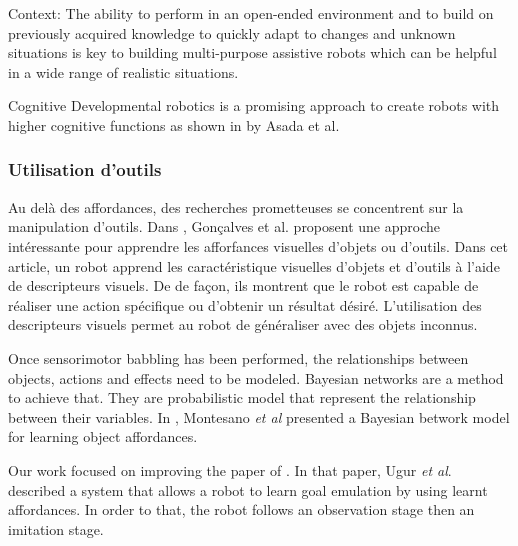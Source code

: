 \documentclass{llncs}
\begin{document}
Context: The ability to perform in an open-ended environment and to build on previously acquired knowledge to quickly adapt to changes and unknown situations is key to building
multi-purpose assistive robots which can be helpful in a wide range of realistic situations.

Cognitive Developmental robotics is a promising approach to create robots with higher cognitive functions as shown in \cite{Asada2009} by Asada et al.

\subsubsection{Utilisation d'outils}
Au delà des affordances, des recherches prometteuses se concentrent sur la manipulation d'outils. Dans \cite{Goncalves2014}, Gonçalves et al. proposent une approche intéressante pour apprendre les afforfances visuelles d'objets ou d'outils. Dans cet article, un robot apprend les caractéristique visuelles d'objets et d'outils à l'aide de descripteurs visuels. De de façon, ils montrent que le robot est capable de réaliser une action spécifique ou d'obtenir un résultat désiré. L'utilisation des descripteurs visuels permet au robot de généraliser avec des objets inconnus.


Once sensorimotor babbling has been performed, the relationships between objects, actions and effects need to be modeled. Bayesian networks are a method to achieve that. They are probabilistic model that represent the relationship between their variables. In \cite{4456755}, Montesano \textit{et al} presented a Bayesian betwork model for learning object affordances.

Our work focused on improving the paper of \cite{Ugur2011}. In that paper, Ugur \textit{et al}.
described a system that allows a robot to learn goal emulation by using learnt affordances. In order to that, the robot follows an observation stage then an imitation stage.
\end{document}
